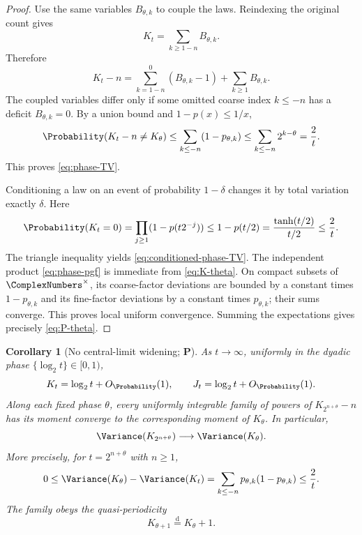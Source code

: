 \documentclass[11pt,oneside]{article}
\newtheorem{corollary}[theorem]{Corollary}
\theoremstyle{definition}
\theoremstyle{remark}
\newcommand{\statusP}{\textcolor{deepgreen}{\textbf{P}}}
\begin{document}
\begin{proof}
Use the same variables $B_{\theta,k}$ to couple the laws.  Reindexing the
original count gives
\[
 K_t=\sum_{k\ge1-n}B_{\theta,k}.
\]
Therefore
\[
 K_t-n
 =\sum_{k=1-n}^0(B_{\theta,k}-1)+\sum_{k\ge1}B_{\theta,k}.
\]
The coupled variables differ only if some omitted coarse index $k\le-n$ has a
deficit $B_{\theta,k}=0$.  By a union bound and
$1-p(x)\le1/x$,
\[
 \Probability(K_t-n\ne K_\theta)
 \le\sum_{k\le-n}(1-p_{\theta,k})
 \le\sum_{k\le-n}2^{k-\theta}=\frac2t.
\]
This proves \eqref{eq:phase-TV}.

Conditioning a law on an event of probability $1-\delta$ changes it by total
variation exactly $\delta$.  Here
\[
 \Probability(K_t=0)=\prod_{j\ge1}(1-p(t2^{-j}))
 \le1-p(t/2)=\frac{\tanh(t/2)}{t/2}\le\frac2t.
\]
The triangle inequality yields \eqref{eq:conditioned-phase-TV}.
The independent product \eqref{eq:phase-pgf} is immediate from
\eqref{eq:K-theta}.  On compact subsets of $\ComplexNumbers^\times$, its coarse-factor
deviations are bounded by a constant times $1-p_{\theta,k}$ and its
fine-factor deviations by a constant times $p_{\theta,k}$; their sums converge.
This proves local uniform convergence.  Summing the expectations gives
precisely \eqref{eq:P-theta}.
\end{proof}

\begin{corollary}[No central-limit widening; \statusP]
\label{cor:no-CLT-width}
As $t\to\infty$, uniformly in the dyadic phase
$\{\log_2t\}\in[0,1)$,
\begin{equation}
 K_t=\log_2t+O_{\Probability}(1),
 \qquad
 J_t=\log_2t+O_{\Probability}(1).
 \label{eq:tight-order}
\end{equation}
Along each fixed phase $\theta$, every uniformly integrable family of powers
of $K_{2^{n+\theta}}-n$ has its moment converge to the corresponding moment of
$K_\theta$.  In particular,
\begin{equation}
 \Variance(K_{2^{n+\theta}})\longrightarrow\Variance(K_\theta).
 \label{eq:variance-phase-limit}
\end{equation}
More precisely, for $t=2^{n+\theta}$ with $n\ge1$,
\begin{equation}
 0\le \Variance(K_\theta)-\Variance(K_t)
 =\sum_{k\le-n}p_{\theta,k}(1-p_{\theta,k})
 \le\frac2t.
 \label{eq:variance-phase-tail}
\end{equation}
The family obeys the quasi-periodicity
\begin{equation}
 K_{\theta+1}\stackrel{\mathrm d}=K_\theta+1.
 \label{eq:phase-quasiperiodic}
\end{equation}
\end{corollary}
\end{document}
